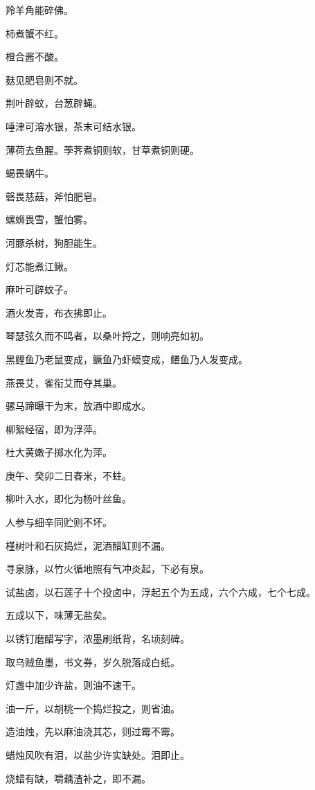 \documentclass[a4paper,12pt,UTF8,twoside]{ctexbook}
\begin{document}
    羚羊角能碎佛。
    
    柿煮蟹不红。
    
    橙合酱不酸。
    
    麸见肥皂则不就。
    
    荆叶辟蚊，台葱辟蝇。
    
    唾津可溶水银，茶末可结水银。
    
    薄荷去鱼腥。荸荠煮铜则软，甘草煮铜则硬。
    
    蝎畏蜗牛。
    
    磬畏慈菇，斧怕肥皂。
    
    螺蛳畏雪，蟹怕雾。
    
    河豚杀树，狗胆能生。
    
    灯芯能煮江鳅。
    
    麻叶可辟蚊子。
    
    酒火发青，布衣拂即止。
    
    琴瑟弦久而不鸣者，以桑叶捋之，则响亮如初。
    
    黑鲤鱼乃老鼠变成，鳜鱼乃虾蟆变成，鳝鱼乃人发变成。
    
    燕畏艾，雀衔艾而夺其巢。
    
    骡马蹄曝干为末，放酒中即成水。
    
    柳絮经宿，即为浮萍。
    
    杜大黄嫩子掷水化为萍。
    
    庚午、癸卯二日舂米，不蛀。
    
    柳叶入水，即化为杨叶丝鱼。
    
    人参与细辛同贮则不坏。
    
    槿树叶和石灰捣烂，泥酒醋缸则不漏。
    
    寻泉脉，以竹火循地照有气冲炎起，下必有泉。
    
    试盐卤，以石莲子十个投卤中，浮起五个为五成，六个六成，七个七成。
    
    五成以下，味薄无盐矣。
    
    以锈钉磨醋写字，浓墨刷纸背，名顷刻碑。
    
    取乌贼鱼墨，书文券，岁久脱落成白纸。
    
    灯盏中加少许盐，则油不速干。
    
    油一斤，以胡桃一个捣烂投之，则省油。
    
    造油烛，先以麻油浇其芯，则过霉不霉。
    
    蜡烛风吹有泪，以盐少许实缺处。泪即止。
    
    烧蜡有缺，嚼藕渣补之，即不漏。
    
\end{document}
